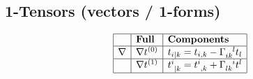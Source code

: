 \documentclass[9pt,a4paper]{scrartcl}
\begin{document}
  \subsection{1-Tensors (vectors / 1-forms)}
  \begin{align*}
    \begin{array}{|l|l|l|l|}\hline  
      &\textbf{Full} & \textbf{Components} 
    \\\hline
      \nabla 
       & \nabla t^{(0)}
        & t_{i|k} = t_{i,k} - \tensor{\Gamma}{_{ik}^{l}}t_{l}
    \\\hline
       & \nabla t^{(1)}
        & \tensor{t}{^{i}_{|k}} = \tensor{t}{^{i}_{,k}} + \tensor{\Gamma}{_{lk}^{i}}t^{l}
    \\\hline
    \end{array}
  \end{align*}

    
\end{document}
